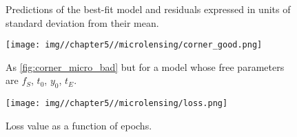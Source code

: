 \begin{figure}
  \begin{minipage}{\linewidth}
    \centering
  \end{minipage}
  \begin{minipage}{\linewidth}
    \centering
  \end{minipage}
  \caption[Microlensing initial predictions and residuals]{\protect{} Predictions of the best-fit model and \protect{} residuals expressed in units of standard deviation from their mean.}
  \label{fig:final_model_micro}
\end{figure}

\begin{figure}
    \centering
    \texttt{[image: img//chapter5//microlensing/corner\_good.png]}
    \caption[Microlensing corner plot non degenerate parameters]{As \cref{fig:corner_micro_bad} but for a model whose free parameters are $f_S$, $t_0$, $y_0$, $t_E$.}
    \label{fig:corner_micro_good}
\end{figure}

\begin{figure}[H]
    \centering
    \texttt{[image: img//chapter5//microlensing/loss.png]}
    \caption[Microlensing loss value as a function of epochs]{Loss value as a function of epochs.}
    \label{fig:micro_loss}
\end{figure}
